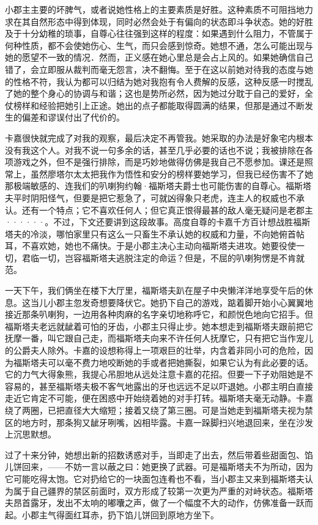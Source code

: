 \documentclass[12pt, UTF8]{ctexbook}
\begin{document}
\par 小郡主主要的坏脾气，或者说她性格上的主要素质是好胜。这种素质不可阻挡地力求在其自然形态中得到体现，同时必然会处于有偏向的状态即斗争状态。她的好胜及于十分幼稚的琐事，自尊心往往强到这样的程度：如果遇到什么阻力，不管属于何种性质，都不会使她伤心、生气，而只会感到惊奇。她想不通，怎么可能出现与她的愿望不一致的情况．然而，正义感在她心里总是会占上风的。如果她确信自己错了，会立即服从裁判而毫无怨言，决不翻悔。至于在这以前她对待我的态度与她的性格不符，我认为都可以归结为她对我抱有令人费解的反感，这种反感一时搅乱了她的整个身心的协调与和谐；这也是势所必然，因为她过分耽于自己的爱好，全仗榜样和经验把她引上正途。她出的点子都能取得圆满的结果，但那是通过不断发生的偏差和谬误付出了代价的。
\par 卡嘉很快就完成了对我的观察，最后决定不再管我。她采取的办法是好象宅内根本没有我这个人。对我不说一句多余的话，甚至几乎必要的话也不说；我被排除在各项游戏之外，但不是强行排除，而是巧妙地做得仿佛是我自己不愿参加。课还是照常上，虽然廖塔尔太太把我作为悟性和安分的榜样要她学习，但我已经伤害不了她那极端敏感的、连我们的叭喇狗约翰·福斯塔夫爵士也可能伤害的自尊心。福斯塔夫平时阴阳怪气，但要是把它惹急了，可就凶得象只老虎，连主人的权威也不承认。还有一个特点；它不喜欢任何人；但它真正恨得最甚的敌人毫无疑问是老郡主······。不过，下文还要讲到这段故事。高度自尊的卡嘉千方百计想战胜福斯塔夫的冷淡，哪怕家里只有这么一只畜生不承认她的权威和力量，不向她俯首帖耳，不喜欢她，她也不痛快。于是小郡主决心主动向福斯塔夫进攻。她要役使一切，君临一切，岂容福斯塔夫逃脱注定的命运？但是，不屈的叭喇狗愣是不肯就范。
\par 一天下午，我们俩坐在楼下大厅里，福斯塔夫趴在屋子中央懒洋洋地享受午后的休息。这当儿小郡主忽发奇想要降伏它。她扔下自己的游戏，踮着脚开始小心翼翼地接近那条叭喇狗，一边用各种肉麻的名字亲切地称呼它，和颜悦色地向它招手。但福斯塔夫老远就龇着可怕的牙齿，小郡主只得止步。她本想走到福斯塔夫跟前把它抚摩一番，叫它跟自己走，而福斯塔夫向来不许任何人抚摩它，只有把它当作宠儿的公爵夫人除外。卡嘉的设想称得上一项艰巨的壮举，内含着非同小可的危险，因为福斯塔夫可以毫不费力地咬断她的手或者把她撕裂，如果它认为有此必要的话。它的力气大得象熊，我提心吊胆地从远处注意卡嘉的花招。但要一下子劝阻她是不容易的，甚至福斯塔夫极不客气地露出的牙也远远不足以吓退她。小郡主明白直接走近它肯定不可能，便在困惑中开始绕着她的对手打转。福斯塔夫毫无动静。卡嘉绕了两圈，已把直径大大缩短；接着又绕了第三圈。可是当她走到福斯塔夫视为禁区的地方时，那条狗又龇牙咧嘴，凶相毕露。卡嘉一跺脚扫兴地退回来，坐在沙发上沉思默想。
\par 过了十来分钟，她想出新的招数诱惑对手，当即走了出去，然后带着些甜面包、馅儿饼回来，——不妨一言以蔽之曰：她更换了武器。可是福斯塔夫不为所动，因为它可能吃得太饱。它对扔给它的一块面包连肴也不看，当小郡主又来到福斯塔夫认为属于自己疆界的禁区前面时，双方形成了较第一次更为严重的对峙状态。福斯塔夫昂首露牙，发出不太响的嘟囔之声，做了一个幅度不大的动作，仿佛准备一跃而起。小郡主气得面红耳赤，扔下馅儿饼回到原地方坐下。
\end{document}
